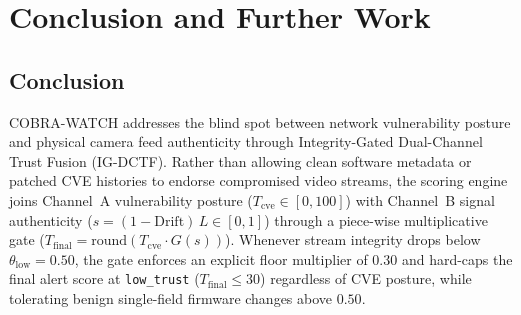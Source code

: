 \chapter{Conclusion and Further Work}

\section{Conclusion}
COBRA-WATCH addresses the blind spot between network vulnerability posture and physical camera feed authenticity through Integrity-Gated Dual-Channel Trust Fusion (IG-DCTF). Rather than allowing clean software metadata or patched CVE histories to endorse compromised video streams, the scoring engine joins Channel~A vulnerability posture ($T_{\mathrm{cve}} \in [0, 100]$) with Channel~B signal authenticity ($s = (1 - \mathrm{Drift})\,L \in [0, 1]$) through a piece-wise multiplicative gate ($T_{\mathrm{final}} = \mathrm{round}(T_{\mathrm{cve}} \cdot G(s))$). Whenever stream integrity drops below $\theta_{\mathrm{low}} = 0.50$, the gate enforces an explicit floor multiplier of $0.30$ and hard-caps the final alert score at \texttt{low\_trust} ($T_{\mathrm{final}} \le 30$) regardless of CVE posture, while tolerating benign single-field firmware changes above $0.50$.

